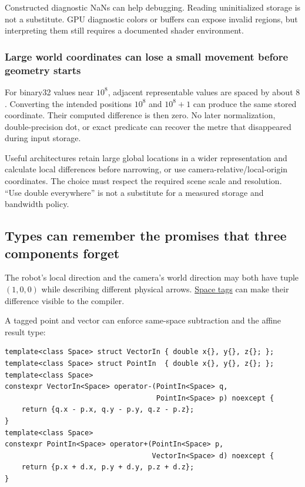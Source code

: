 Constructed diagnostic NaNs can help debugging. Reading uninitialized storage is not a substitute. GPU diagnostic colors or buffers can expose invalid regions, but interpreting them still requires a documented shader environment.

\subsubsection{Large world coordinates can lose a small movement before geometry starts}\label{02-foundations-ii-ch037-large-world-coordinates-can-lose-a-small-movement-before-geometry-starts}

For binary32 values near \(10^8\), adjacent representable values are spaced by about \(8\). Converting the intended positions \(10^8\) and \(10^8+1\) can produce the same stored coordinate. Their computed difference is then zero. No later normalization, double-precision dot, or exact predicate can recover the metre that disappeared during input storage.

Useful architectures retain large global locations in a wider representation and calculate local differences before narrowing, or use camera-relative/local-origin coordinates. The choice must respect the required scene scale and resolution. ``Use double everywhere'' is not a substitute for a measured storage and bandwidth policy.

\subsection{Types can remember the promises that three components forget}\label{02-foundations-ii-ch037-types-can-remember-the-promises-that-three-components-forget}

The robot's local direction and the camera's world direction may both have tuple \((1,0,0)\) while describing different physical arrows. \hyperref[02-foundations-ii-ch037-types-can-remember-the-promises-that-three-components-forget]{Space tags} can make their difference visible to the compiler.

A tagged point and vector can enforce same-space subtraction and the affine result type:

\begin{verbatim}
template<class Space> struct VectorIn { double x{}, y{}, z{}; };
template<class Space> struct PointIn  { double x{}, y{}, z{}; };
template<class Space>
constexpr VectorIn<Space> operator-(PointIn<Space> q,
                                    PointIn<Space> p) noexcept {
    return {q.x - p.x, q.y - p.y, q.z - p.z};
}
template<class Space>
constexpr PointIn<Space> operator+(PointIn<Space> p,
                                   VectorIn<Space> d) noexcept {
    return {p.x + d.x, p.y + d.y, p.z + d.z};
}
\end{verbatim}

